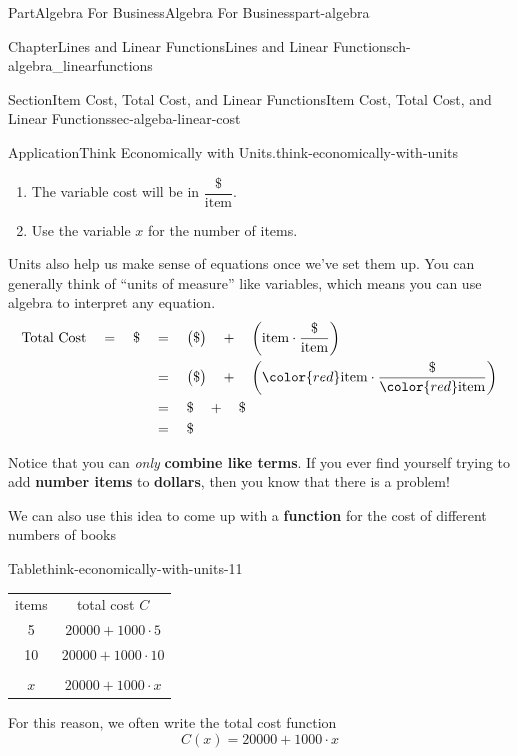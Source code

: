 \documentclass[oneside,10pt,]{tufte-book}
\newcommand{\tabularfont}{\relax}
\newcommand{\terminology}[1]{\textbf{#1}}
\numberwithin{equation}{chapter}
\begin{document}
\begin{partptx}{Part}{Algebra For Business}{}{Algebra For Business}{}{}{part-algebra}
\begin{chapterptx}{Chapter}{Lines and Linear Functions}{}{Lines and Linear Functions}{}{}{ch-algebra_linearfunctions}
\begin{sectionptx}{Section}{Item Cost, Total Cost, and Linear Functions}{}{Item Cost, Total Cost, and Linear Functions}{}{}{sec-algeba-linear-cost}
\begin{insight}{Application}{Think Economically with Units.}{think-economically-with-units}
\begin{enumerate}
\item{}The variable cost will be in \(\dfrac{\$}{\text{item}}\).%
\item{}Use the variable \(x\) for the number of items.%
\end{enumerate}
%
\par
Units also help us make sense of equations once we've set them up. You can generally think of ``units of measure'' like variables, which means you can use algebra to interpret any equation.%
\begin{equation*}
\begin{aligned}
\text{Total Cost} \quad = \quad \$ 
&\quad =\quad 
\big(\$\big)\quad +\quad \left( \text{item}\cdot\dfrac{\$}{\text{item}}\right)
\\
&\quad =\quad 
\big(\$\big)\quad +\quad \left(  {\color{red}\text{item}}\cdot\dfrac{\$}{{\color{red}\text{item}}}\right) 
\\
&\quad =\quad 
\$\quad + \quad \$
\\ 
&\quad =\quad
\$\end{aligned}
\end{equation*}
%
\par
Notice that you can \emph{only} \terminology{combine like terms}. If you ever find yourself trying to add \terminology{number items} to \terminology{dollars}, then you know that there is a problem!%
\par
We can also use this idea to come up with a \terminology{function} for the cost of different numbers of books%
\begin{tableptx}{Table}{\textbf{}}{think-economically-with-units-11}{}%
\centering%
{\tabularfont%
\begin{tabular}{ll}
\multicolumn{1}{c}{items}&\multicolumn{1}{c}{total cost \(C\)}\tabularnewline[0pt]
\multicolumn{1}{c}{5}&\multicolumn{1}{c}{\(20000 + 1000\cdot 5\)}\tabularnewline[0pt]
\multicolumn{1}{c}{10}&\multicolumn{1}{c}{\(20000 + 1000\cdot 10\)}\tabularnewline[0pt]
\multicolumn{1}{c}{}&\multicolumn{1}{c}{}\tabularnewline[0pt]
\multicolumn{1}{c}{\(x\)}&\multicolumn{1}{c}{\(20000 + 1000\cdot x\)}
\end{tabular}
}%
\end{tableptx}%
For this reason, we often write the total cost function%
\begin{equation*}
C(x) = 20000 + 1000\cdot x
\end{equation*}
%
\end{insight}
\end{sectionptx}
%
%
\typeout{************************************************}

\end{chapterptx}
\end{partptx}
\end{document}
